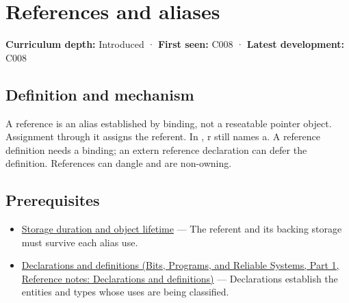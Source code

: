 \hypertarget{appendix-d6d562ca9fbb}{}\label{referencestart:appendix-d6d562ca9fbb}
\section{References and aliases}\label{appendix-d6d562ca9fbb-references-and-aliases}

\hypertarget{appendix-d6d562ca9fbb-references-and-aliases}{}

\textbf{Curriculum depth:} Introduced · \textbf{First seen:} C008 · \textbf{Latest development:} C008

\begin{allmightroledefinition}

\subsection{Definition and mechanism}\label{appendix-d6d562ca9fbb-definition-and-mechanism}

\hypertarget{appendix-d6d562ca9fbb-definition-and-mechanism}{}

A reference is an alias established by binding, not a reseatable pointer object. Assignment through it assigns the referent. In , r still names a. A reference definition needs a binding; an extern reference declaration can defer the definition. References can dangle and are non-owning.

\end{allmightroledefinition}

\subsection{Prerequisites}\label{appendix-d6d562ca9fbb-prerequisites}

\hypertarget{appendix-d6d562ca9fbb-prerequisites}{}

\begin{itemize}
\tightlist
\item
  \hyperref[appendix-0b104bcba06b]{Storage duration and object lifetime} --- The referent and its backing storage must survive each alias use.
\item
  \href{../01-Bits-Programs-and-Reliable-Systems-P01/main.pdf\#nameddest=appendix-2e4d494c2d94}{Declarations and definitions (Bits, Programs, and Reliable Systems, Part 1, Reference notes: Declarations and definitions)} --- Declarations establish the entities and types whose uses are being classified.
\end{itemize}

